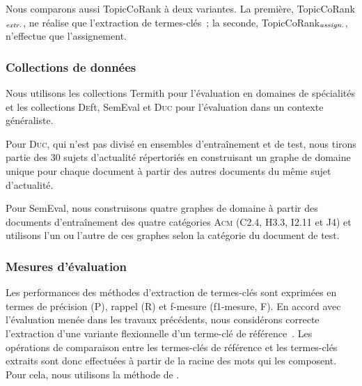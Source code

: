         Nous comparons aussi TopicCoRank à deux variantes. La première,
        TopicCoRank$_\textnormal{\textit{extr.}}$, ne réalise que l'extraction
        de termes-clés~; la seconde,
        TopicCoRank$_\textnormal{\textit{assign.}}$, n'effectue que
        l'assignement.

      \subsubsection{Collections de données}
      \label{subsubsec:main-domain_specific_keyphrase_annotation-supervised_automatic_keyphrase_annotation-evaluation-evaluation_data}
        Nous utilisons les collections Termith pour l'évaluation en domaines de
        spécialités et les collections \textsc{De}ft, SemEval et \textsc{Duc}
        pour l'évaluation dans un contexte généraliste.
        
        Pour \textsc{Duc}, qui n'est pas divisé en ensembles d'entraînement et
        de test, nous tirons partie des 30 sujets d'actualité répertoriés en
        construisant un graphe \og{}de domaine\fg{} unique pour chaque document
        à partir des autres documents du même sujet d'actualité.
        
        Pour SemEval, nous construisons quatre graphes de domaine à partir des
        documents d'entraînement des quatre catégories \textsc{Acm} (C2.4, H3.3,
        I2.11 et J4) et utilisons l'un ou l'autre de ces graphes selon la
        catégorie du document de test. 
      
      \subsubsection{Mesures d'évaluation}
      \label{subsubsec:main-domain_specific_keyphrase_annotation-supervised_automatic_keyphrase_annotation-evaluation-evaluation_measures}
        Les performances des méthodes d'extraction de termes-clés sont exprimées
        en termes de précision (P), rappel (R) et f-mesure (f1-mesure, F). En
        accord avec l'évaluation menée dans les travaux précédents, nous
        considérons correcte l'extraction d'une variante flexionnelle d'un
        terme-clé de référence~\cite{kim2010semeval}. Les opérations de
        comparaison entre les termes-clés de référence et les termes-clés
        extraits sont donc effectuées à partir de la racine des mots qui les
        composent. Pour cela, nous utilisons la méthode de
        .

